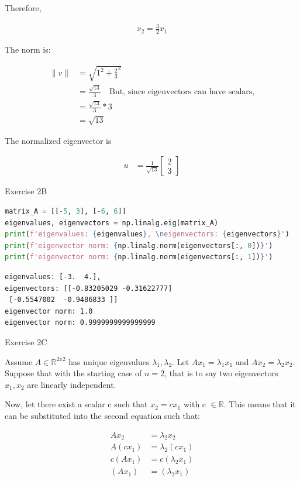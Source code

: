 \documentclass[11pt,letterpaper]{article}
\begin{document}
\begin{enumerate}
Therefore,

\begin{align*}
x_2 = \frac{3}{2} x_1
\end{align*}

The norm is:

\begin{align*}
\lVert v \rVert &= \sqrt{1^2 + \frac{2}{3}^2} \\
&= \frac{\sqrt{13}}{3} \quad \text{But, since eigenvectors can have scalars,} \\
&= \frac{\sqrt{13}}{3} * 3 \\
&= \sqrt{13}
\end{align*}

The normalized eigenvector is

\begin{align*}
u &= \frac{1}{\sqrt{13}} \begin{bmatrix} 2 \\ 3 \end{bmatrix}
\end{align*}

\noindent\dotfill Exercise 2B \noindent\dotfill
\begin{lstlisting}[language=Python]
matrix_A = [[-5, 3], [-6, 6]]
eigenvalues, eigenvectors = np.linalg.eig(matrix_A)
print(f'eigenvalues: {eigenvalues}, \neigenvectors: {eigenvectors}')
print(f'eigenvector norm: {np.linalg.norm(eigenvectors[:, 0])}')
print(f'eigenvector norm: {np.linalg.norm(eigenvectors[:, 1])}')
\end{lstlisting}

\begin{lstlisting}
eigenvalues: [-3.  4.], 
eigenvectors: [[-0.83205029 -0.31622777]
 [-0.5547002  -0.9486833 ]]
eigenvector norm: 1.0
eigenvector norm: 0.9999999999999999
\end{lstlisting}

\noindent\dotfill Exercise 2C \noindent\dotfill

Assume \( A \in \mathbb{R}^{2x2} \) has unique eigenvalues \( \lambda_1 , \lambda_2 \). Let \(Ax_1 = \lambda_1 x_1 \) and \(Ax_2 = \lambda_2 x_2 \). Suppose that with the starting case of \( n = 2 \), that is to say two eigenvectors \( x_1, x_2 \) are linearly independent.

Now, let there exist a scalar c such that \( x_2 = c x_1 \) with c \( \in \mathbb{R} \). This means that it can be substituted into the second equation such that:

\begin{align*}
Ax_2 &= \lambda_2 x_2 \\
A(c x_1) &= \lambda_2 (c x_1) \\
c(A x_1) &= c (\lambda_2 x_1) \\
(A x_1) &= (\lambda_2 x_1)
\end{align*}


\end{enumerate}
\end{document}
